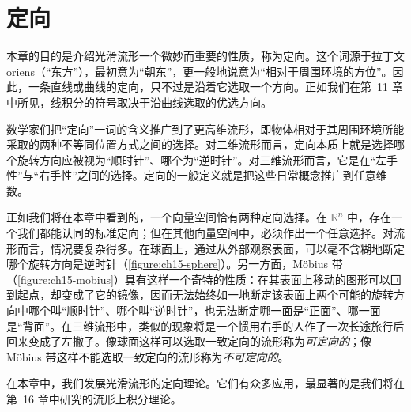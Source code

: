 \documentclass[../main.tex]{subfiles}
\begin{document}
\chapter{定向}\label{chapter:ch15-orientations}

本章的目的是介绍光滑流形一个微妙而重要的性质，称为定向。这个词源于拉丁文 oriens（“东方”），最初意为“朝东”，更一般地说意为“相对于周围环境的方位”。因此，一条直线或曲线的定向，只不过是沿着它选取一个方向。正如我们在第~11 章中所见，线积分的符号取决于沿曲线选取的优选方向。

数学家们把“定向”一词的含义推广到了更高维流形，即物体相对于其周围环境所能采取的两种不等同位置方式之间的选择。对二维流形而言，定向本质上就是选择哪个旋转方向应被视为“顺时针”、哪个为“逆时针”。对三维流形而言，它是在“左手性”与“右手性”之间的选择。定向的一般定义就是把这些日常概念推广到任意维数。

正如我们将在本章中看到的，一个向量空间恰有两种定向选择。在 $\mathbb{R}^n$ 中，存在一个我们都能认同的标准定向；但在其他向量空间中，必须作出一个任意选择。对流形而言，情况要复杂得多。在球面上，通过从外部观察表面，可以毫不含糊地断定哪个旋转方向是逆时针（\cref{figure:ch15-sphere}）。另一方面，Möbius 带（\cref{figure:ch15-mobius}）具有这样一个奇特的性质：在其表面上移动的图形可以回到起点，却变成了它的镜像，因而无法始终如一地断定该表面上两个可能的旋转方向中哪个叫“顺时针”、哪个叫“逆时针”，也无法断定哪一面是“正面”、哪一面是“背面”。在三维流形中，类似的现象将是一个惯用右手的人作了一次长途旅行后回来变成了左撇子。像球面这样可以选取一致定向的流形称为\emph{可定向的}；像 Möbius 带这样不能选取一致定向的流形称为\emph{不可定向的}。

在本章中，我们发展光滑流形的定向理论。它们有众多应用，最显著的是我们将在第~16 章中研究的流形上积分理论。






\end{document}

